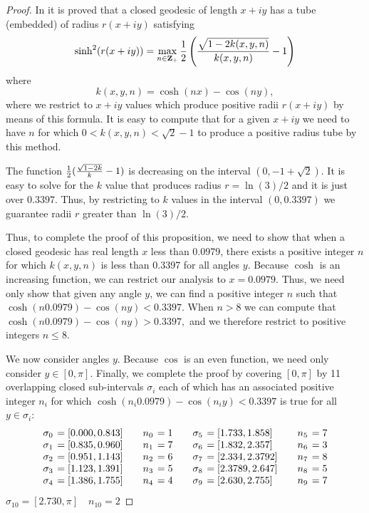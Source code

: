 \begin{proof}   In  \cite{Me} it is proved that a closed geodesic of length $x + iy$ has a tube (embedded) of radius $r(x + iy)$ satisfying 
$$
\sinh^2(r(x + iy))  =  \max_{n \in \mathbf {Z_+}} {1 \over 2} \left({\sqrt{1 - 2k(x,y,n)} \over k(x,y,n)} - 1\right) 
$$
where
$$k(x,y,n)  =  \cosh(nx) -
\cos(ny),
$$
 where we restrict to $x+iy$ values which produce positive radii $r(x + iy)$ by means of this formula. It is easy to compute that for a
given $x+iy$ we need to have $n$ for which $0 < k(x,y,n) < \sqrt 2 - 1$ to produce a positive radius tube by this method.

The function ${1 \over 2} ({\sqrt{1 - 2k} \over k} - 1)$ is decreasing on the interval $(0, -1 + \sqrt 2).$  It is easy to solve for the $k$ value that produces radius $r = \ln(3)/2$ and it is just over $0.3397.$ Thus, by restricting to $k$ values in the interval $(0,0.3397)$ we guarantee radii $r$ greater than $\ln(3)/2.$

Thus, to complete the proof of this proposition, we need to show that when a closed geodesic has real length $x$ less than 0.0979,  there exists a positive integer $n$ for which $k(x,y,n)$ is less than 0.3397
for all angles $y$.
Because $\cosh$ is an increasing function, we can restrict our analysis to $x = 0.0979.$  Thus,  we need only show that given
\pagebreak any angle $y$, we can find a positive integer $n$ such that 
$\cosh(n 0.0979) - \cos(ny) < 0.3397.$  When $n > 8$ we can compute that $\cosh(n 0.0979) - \cos(ny) > 0.3397,$ and we therefore restrict to positive integers $n \leq 8.$  

We now consider angles $y$.  Because $\cos$ is an even function, we need only consider $y \in [0, \pi].$  
Finally, we complete the proof by covering $[0,\pi]$ by 11 overlapping closed sub-intervals $\sigma_i$ each of which has an associated positive integer $n_i$ for which $\cosh(n_i 0.0979) - \cos(n_i y) < 0.3397$ is
 true for all $y \in \sigma_i$:
$$
\begin{array}{rlrlrlrl}
\sigma_0&\hskip-6pt= [0.000, 0.843] &\quad n_0 &\hskip-6pt= 1&\quad
   \sigma_5&\hskip-6pt= [1.733, 1.858] &\quad n_5 &\hskip-6pt= 7\\
 \sigma_1 &\hskip-6pt= [0.835, 0.960] & n_1&\hskip-6pt= 7&
   \sigma_6&\hskip-6pt= [1.832, 2.357] & n_6&\hskip-6pt= 3\\
 \sigma_2&\hskip-6pt= [0.951, 1.143]& n_2&\hskip-6pt= 6&
   \sigma_7&\hskip-6pt= [2.334, 2.3792]& n_7&\hskip-6pt= 8\\
 \sigma_3 &\hskip-6pt= [1.123, 1.391] & n_3&\hskip-6pt= 5&
   \sigma_8&\hskip-6pt= [2.3789, 2.647] & n_8 &\hskip-6pt= 5\\
 \sigma_4&\hskip-6pt= [1.386, 1.755] & n_4 &\hskip-6pt= 4&
   \sigma_9 &\hskip-6pt= [2.630, 2.755]&n_9&\hskip-6pt= 7\\
\end{array}
$$
\hfill $ \sigma_{10}  = [2.730, \pi] \quad  n_{10}  = 2$ 
\end{proof}

